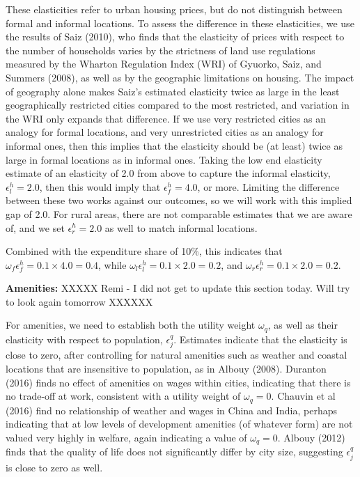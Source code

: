 \documentclass[10pt]{article}
\begin{document}
These elasticities refer to urban housing prices, but do not distinguish between formal and informal locations. To assess the difference in these elasticities, we use the results of Saiz (2010), who finds that the elasticity of prices with respect to the number of households varies by the strictness of land use regulations measured by the Wharton Regulation Index (WRI) of Gyuorko, Saiz, and Summers (2008), as well as by the geographic limitations on housing. The impact of geography alone makes Saiz's estimated elasticity twice as large in the least geographically restricted cities compared to the most restricted, and variation in the WRI only expands that difference. If we use very restricted cities as an analogy for formal locations, and very unrestricted cities as an analogy for informal ones, then this implies that the elasticity should be (at least) twice as large in formal locations as in informal ones. Taking the low end elasticity estimate of an elasticity of 2.0 from above to capture the informal elasticity, $\epsilon^h_l = 2.0$, then this would imply that $\epsilon^h_f = 4.0$, or more. Limiting the difference between these two works against our outcomes, so we will work with this implied gap of 2.0. For rural areas, there are not comparable estimates that we are aware of, and we set $\epsilon^h_r = 2.0$ as well to match informal locations.

Combined with the expenditure share of 10\%, this indicates that $\omega_f \epsilon^h_f = 0.1 \times 4.0 = 0.4$, while $\omega_l \epsilon^h_l = 0.1 \times 2.0 = 0.2$, and $\omega_r \epsilon^h_r = 0.1 \times 2.0 = 0.2$. 

\textbf{Amenities:} 
XXXXX Remi - I did not get to update this section today. Will try to look again tomorrow XXXXXX

For amenities, we need to establish both the utility weight $\omega_q$, as well as their elasticity with respect to population, $\epsilon^q_j$. Estimates indicate that the elasticity is close to zero, after controlling for natural amenities such as weather and coastal locations that are insensitive to population, as in Albouy (2008). Duranton (2016) finds no effect of amenities on wages within cities, indicating that there is no trade-off at work, consistent with a utility weight of $\omega_q = 0$. Chauvin et al (2016) find no relationship of weather and wages in China and India, perhaps indicating that at low levels of development amenities (of whatever form) are not valued very highly in welfare, again indicating a value of $\omega_q = 0$. Albouy (2012) finds that the quality of life does not significantly differ by city size, suggesting $\epsilon^q_j$ is close to zero as well. 
\end{document}
